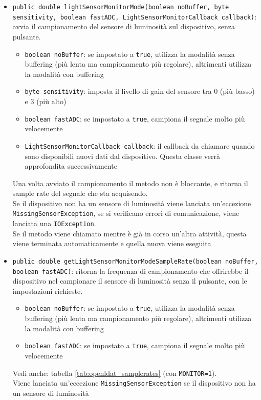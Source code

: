 \begin{itemize}
	\item \texttt{public double lightSensorMonitorMode(boolean noBuffer, byte sensitivity, boolean fastADC, LightSensorMonitorCallback callback)}: avvia il campionamento del sensore di luminosità sul dispositivo, senza pulsante.\begin{itemize}
		\item \texttt{boolean noBuffer}: se impostato a \texttt{true}, utilizza la modalità senza buffering (più lenta ma campionamento più regolare), altrimenti utilizza la modalità con buffering
		\item \texttt{byte sensitivity}: imposta il livello di gain del sensore tra 0 (più basso) e 3 (più alto)
		\item \texttt{boolean fastADC}: se impostato a \texttt{true}, campiona il segnale molto più velocemente
		\item \texttt{LightSensorMonitorCallback callback}: il callback da chiamare quando sono disponibili nuovi dati dal dispositivo. Questa classe verrà approfondita successivamente
	\end{itemize}
	Una volta avviato il campionamento il metodo non è bloccante, e ritorna il sample rate del segnale che sta acquisendo.\\
	Se il dispositivo non ha un sensore di luminosità viene lanciata un'eccezione \texttt{MissingSensorException}, se si verificano errori di comunicazione, viene lanciata una \texttt{IOException}.\\
	Se il metodo viene chiamato mentre è già in corso un'altra attività, questa viene terminata automaticamente e quella nuova viene eseguita
	\item \texttt{public double getLightSensorMonitorModeSampleRate(boolean noBuffer, boolean fastADC)}: ritorna la frequenza di campionamento che offrirebbe il dispositivo nel campionare il sensore di luminosità senza il pulsante, con le impostazioni richieste.\begin{itemize}
		\item \texttt{boolean noBuffer}: se impostato a \texttt{true}, utilizza la modalità senza buffering (più lenta ma campionamento più regolare), altrimenti utilizza la modalità con buffering
		\item \texttt{boolean fastADC}: se impostato a \texttt{true}, campiona il segnale molto più velocemente
	\end{itemize}
	Vedi anche: tabella \ref{tab:openldat_samplerates} (con \texttt{MONITOR=1}).\\
	Viene lanciata un'eccezione \texttt{MissingSensorException} se il dispositivo non ha un sensore di luminosità

\end{itemize}
